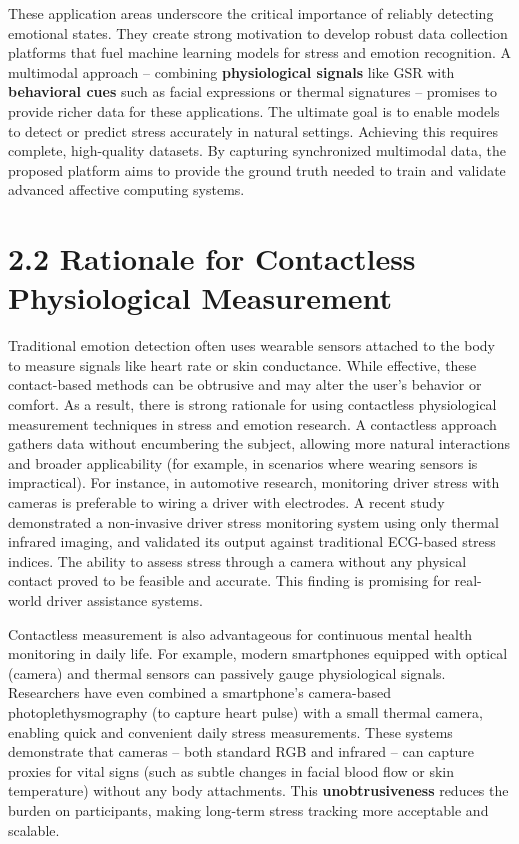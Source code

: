 \documentclass[11pt,a4paper]{report}
\begin{document}
These application areas underscore the critical importance of reliably detecting emotional states. They create strong motivation to develop robust data collection platforms that fuel machine learning models for stress and emotion recognition. A multimodal approach – combining \textbf{physiological signals} like GSR with \textbf{behavioral cues} such as facial expressions or thermal signatures – promises to provide richer data for these applications. The ultimate goal is to enable models to detect or predict stress accurately in natural settings. Achieving this requires complete, high-quality datasets. By capturing synchronized multimodal data, the proposed platform aims to provide the ground truth needed to train and validate advanced affective computing systems.

\section{2.2 Rationale for Contactless Physiological Measurement}

Traditional emotion detection often uses wearable sensors attached to the body to measure signals like heart rate or skin conductance. While effective, these contact-based methods can be obtrusive and may alter the user's behavior or comfort. As a result, there is strong rationale for using contactless physiological measurement techniques in stress and emotion research. A contactless approach gathers data without encumbering the subject, allowing more natural interactions and broader applicability (for example, in scenarios where wearing sensors is impractical). For instance, in automotive research, monitoring driver stress with cameras is preferable to wiring a driver with electrodes. A recent study demonstrated a non-invasive driver stress monitoring system using only thermal infrared imaging, and validated its output against traditional ECG-based stress indices\cite{DriverStressThermal2020}. The ability to assess stress through a camera without any physical contact proved to be feasible and accurate. This finding is promising for real-world driver assistance systems.

Contactless measurement is also advantageous for continuous mental health monitoring in daily life. For example, modern smartphones equipped with optical (camera) and thermal sensors can passively gauge physiological signals. Researchers have even combined a smartphone's camera-based photoplethysmography (to capture heart pulse) with a small thermal camera, enabling quick and convenient daily stress measurements\cite{GSRFacialThermal2021}. These systems demonstrate that cameras – both standard RGB and infrared – can capture proxies for vital signs (such as subtle changes in facial blood flow or skin temperature) without any body attachments. This \textbf{unobtrusiveness} reduces the burden on participants, making long-term stress tracking more acceptable and scalable.
\end{document}
